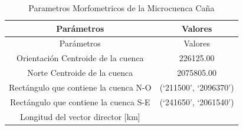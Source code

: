 \documentclass[11pt,]{article}
\begin{document}
\begin{longtable}[]{@{}cc@{}}
\caption{\label{tab:parametrosmorfo} Parametros Morfometricos de la
Microcuenca Caña}\tabularnewline
\toprule
\begin{minipage}[b]{0.75\columnwidth}\centering\strut
Parámetros\strut
\end{minipage} & \begin{minipage}[b]{0.19\columnwidth}\centering\strut
Valores\strut
\end{minipage}\tabularnewline
\midrule
\endfirsthead
\toprule
\begin{minipage}[b]{0.75\columnwidth}\centering\strut
Parámetros\strut
\end{minipage} & \begin{minipage}[b]{0.19\columnwidth}\centering\strut
Valores\strut
\end{minipage}\tabularnewline
\midrule
\endhead
\begin{minipage}[t]{0.75\columnwidth}\centering\strut
Orientación Centroide de la cuenca\strut
\end{minipage} & \begin{minipage}[t]{0.19\columnwidth}\centering\strut
226125.00\strut
\end{minipage}\tabularnewline
\begin{minipage}[t]{0.75\columnwidth}\centering\strut
Norte Centroide de la cuenca\strut
\end{minipage} & \begin{minipage}[t]{0.19\columnwidth}\centering\strut
2075805.00\strut
\end{minipage}\tabularnewline
\begin{minipage}[t]{0.75\columnwidth}\centering\strut
Rectángulo que contiene la cuenca N-O\strut
\end{minipage} & \begin{minipage}[t]{0.19\columnwidth}\centering\strut
(`211500', `2096370')\strut
\end{minipage}\tabularnewline
\begin{minipage}[t]{0.75\columnwidth}\centering\strut
Rectángulo que contiene la cuenca S-E\strut
\end{minipage} & \begin{minipage}[t]{0.19\columnwidth}\centering\strut
(`241650', `2061540')\strut
\end{minipage}\tabularnewline
\begin{minipage}[t]{0.75\columnwidth}\centering\strut
Longitud del vector director {[}km{]}\strut
\end{minipage} & \begin{minipage}[t]{0.19\columnwidth}\centering\strut

\end{minipage}
\end{longtable}
\end{document}
